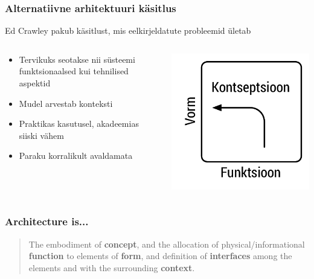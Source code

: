 \begin{frame}
	\frametitle{Alternatiivne arhitektuuri käsitlus}
	Ed Crawley pakub käsitlust, mis eelkirjeldatute probleemid ületab
	\begin{columns}[t]
		\begin{column}{6cm}
			\begin{itemize}
				\item Tervikuks seotakse nii süsteemi funktsionaalsed kui tehnilised aspektid 
				\item Mudel arvestab konteksti
				\item Praktikas kasutusel, akadeemias siiski vähem
				\item Paraku korralikult avaldamata
			\end{itemize}
		\end{column}
		\begin{column}[T]{4cm}
			\includegraphics[width=\textwidth]{ffc.pdf}
		\end{column}
	\end{columns}

\end{frame}


\begin{frame}[fragile]
  \frametitle{Architecture is...}
  		\begin{center}
			\begin{quote}
			The embodiment of \textbf{concept}, and the allocation of physical/informational \textbf{function} to elements of \textbf{form}, and definition of \textbf{interfaces} among the elements and with the surrounding \textbf{context}.
			\end{quote}
		\end{center}
	\cite{edcrawley} 
\end{frame}

